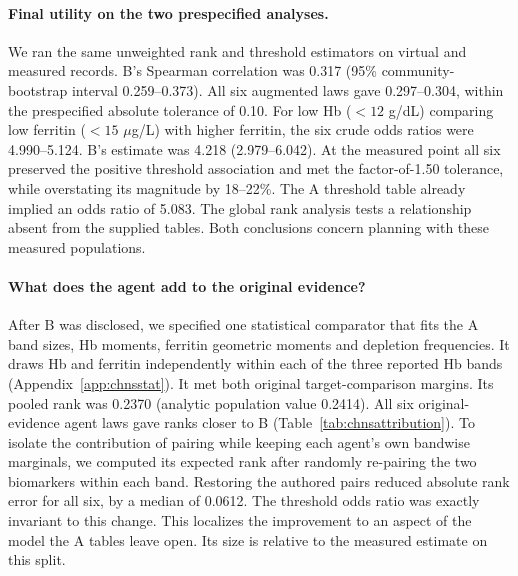 \documentclass[sigconf,anonymous,review]{acmart}
\begin{document}
\paragraph{Final utility on the two prespecified analyses.}
We ran the same unweighted rank and threshold estimators on virtual and measured records. B's Spearman correlation was 0.317 (95\% community-bootstrap interval 0.259--0.373). All six augmented laws gave 0.297--0.304, within the prespecified absolute tolerance of 0.10. For low Hb ($<12$ g/dL) comparing low ferritin ($<15$ $\mu$g/L) with higher ferritin, the six crude odds ratios were 4.990--5.124. B's estimate was 4.218 (2.979--6.042). At the measured point all six preserved the positive threshold association and met the factor-of-1.50 tolerance, while overstating its magnitude by 18--22\%. The A threshold table already implied an odds ratio of 5.083. The global rank analysis tests a relationship absent from the supplied tables. Both conclusions concern planning with these measured populations.

\paragraph{What does the agent add to the original evidence?}
After B was disclosed, we specified one statistical comparator that fits the A band sizes, Hb moments, ferritin geometric moments and depletion frequencies. It draws Hb and ferritin independently within each of the three reported Hb bands (Appendix~\ref{app:chnsstat}). It met both original target-comparison margins. Its pooled rank was 0.2370 (analytic population value 0.2414). All six original-evidence agent laws gave ranks closer to B (Table~\ref{tab:chnsattribution}). To isolate the contribution of pairing while keeping each agent's own bandwise marginals, we computed its expected rank after randomly re-pairing the two biomarkers within each band. Restoring the authored pairs reduced absolute rank error for all six, by a median of 0.0612. The threshold odds ratio was exactly invariant to this change. This localizes the improvement to an aspect of the model the A tables leave open. Its size is relative to the measured estimate on this split.
\end{document}
